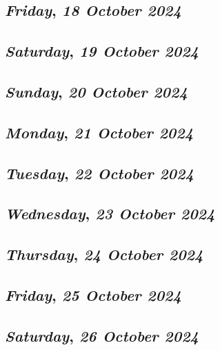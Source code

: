 \def\day{\textit{18 October 2024}}
\def\weekday{\textit{Friday}}
\subsection*{\weekday, \day}

\def\day{\textit{19 October 2024}}
\def\weekday{\textit{Saturday}}
\subsection*{\weekday, \day}

\def\day{\textit{20 October 2024}}
\def\weekday{\textit{Sunday}}
\subsection*{\weekday, \day}

\def\day{\textit{21 October 2024}}
\def\weekday{\textit{Monday}}
\subsection*{\weekday, \day}

\def\day{\textit{22 October 2024}}
\def\weekday{\textit{Tuesday}}
\subsection*{\weekday, \day}

\def\day{\textit{23 October 2024}}
\def\weekday{\textit{Wednesday}}
\subsection*{\weekday, \day}

\def\day{\textit{24 October 2024}}
\def\weekday{\textit{Thursday}}
\subsection*{\weekday, \day}

\def\day{\textit{25 October 2024}}
\def\weekday{\textit{Friday}}
\subsection*{\weekday, \day}

\def\day{\textit{26 October 2024}}
\def\weekday{\textit{Saturday}}
\subsection*{\weekday, \day}

